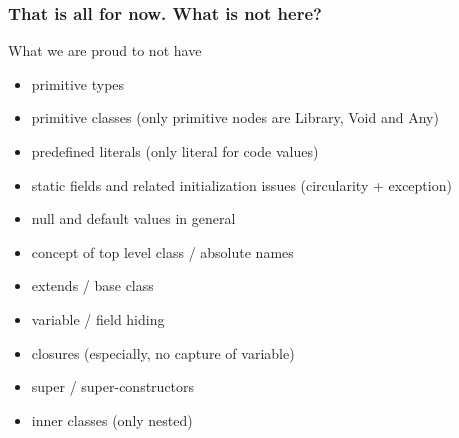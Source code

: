 %


\begin{frame}[fragile]
\frametitle{That is all for now. What is \textbf{not} here?}
What we are proud to not have
\begin{itemize}
\item primitive types
\item primitive classes (only primitive nodes are Library, Void and Any)
\item predefined literals (only literal for code values)
\item static fields and related initialization issues (circularity + exception)
\item null and default values in general
\item concept of top level class / absolute names
\item extends / base class
\item variable / field hiding
\item closures (especially, no capture of variable)
\item super / super-constructors
\item inner classes (only nested)
\end{itemize}

\end{frame}

